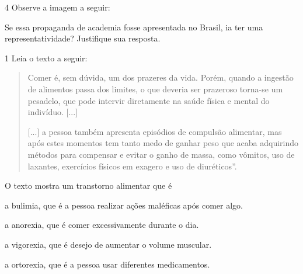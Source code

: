 \num{4}  Observe a imagem a seguir:



Se essa propaganda de academia fosse apresentada no Brasil, ia ter uma
representatividade? Justifique sua resposta.




\num{1} Leia o texto a seguir:

\begin{quote}
Comer é, sem dúvida, um dos prazeres da vida. Porém, quando a ingestão
de alimentos passa dos limites, o que deveria ser prazeroso torna-se um
pesadelo, que pode intervir diretamente na saúde física e mental do
indivíduo. {[}...{]}

{[}...{]} a pessoa também apresenta episódios de compulsão alimentar,
mas após estes momentos tem tanto medo de ganhar peso que acaba
adquirindo métodos para compensar e evitar o ganho de massa, como
vômitos, uso de laxantes, exercícios físicos em exagero e uso de
diuréticos''.

\end{quote}

O texto mostra um transtorno alimentar que é

\begin{escolha}
\item a bulimia, que é a pessoa realizar ações maléficas após comer algo.

\item a anorexia, que é comer excessivamente durante o dia.

\item a vigorexia, que é desejo de aumentar o volume muscular.

\item a ortorexia, que é a pessoa usar diferentes medicamentos.
\end{escolha}

